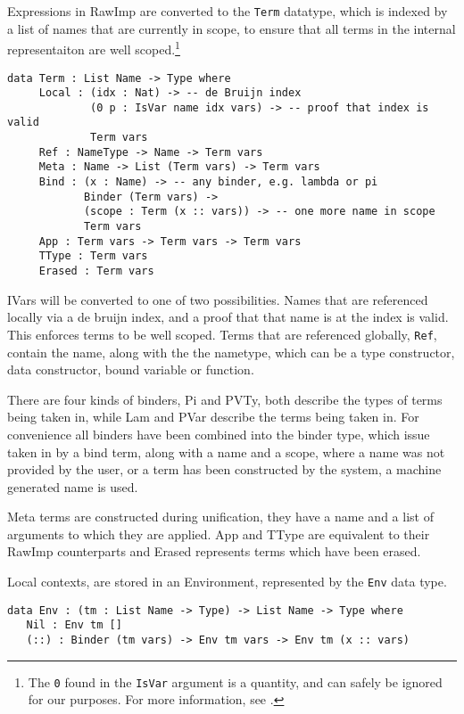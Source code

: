 \documentclass[a4paper]{article}
\begin{document}
Expressions in RawImp are converted to the \texttt{Term} datatype, which is 
indexed by a list of names that are currently in scope, to ensure that
all terms in the internal representaiton are well scoped.\footnote{The \texttt{0} found in the \texttt{IsVar} argument is a quantity, and can safely be ignored for our purposes. For more information, see .}

\begin{center}
\begin{verbatim}
data Term : List Name -> Type where
	 Local : (idx : Nat) -> -- de Bruijn index
			 (0 p : IsVar name idx vars) -> -- proof that index is valid
			 Term vars
	 Ref : NameType -> Name -> Term vars 
	 Meta : Name -> List (Term vars) -> Term vars
	 Bind : (x : Name) -> -- any binder, e.g. lambda or pi
			Binder (Term vars) ->
			(scope : Term (x :: vars)) -> -- one more name in scope
			Term vars
	 App : Term vars -> Term vars -> Term vars 
	 TType : Term vars
	 Erased : Term vars
\end{verbatim}
\end{center}

IVars will be converted to one of two possibilities. Names that are
referenced locally via a de bruijn index, and a proof that that name
is at the index is valid. This enforces terms to be well scoped. Terms 
that are referenced globally, \texttt{Ref}, contain the name, along with the the
nametype, which can be a type constructor, data constructor, bound 
variable or function. 

There are four kinds of binders, Pi and PVTy, both describe the types 
of terms being taken in, while Lam and PVar describe the terms being
taken in. For convenience all binders have been combined into the binder type, 
which issue taken in by a bind term, along with a name and a scope,
where a name was not provided by the user, or a term has been 
constructed by the system, a machine generated name is used. 

Meta terms are constructed during unification, they have a name and a
list of arguments to which they are applied. App and TType are 
equivalent to their RawImp counterparts and Erased represents
terms which have been erased.

Local contexts, are stored in an Environment, represented by the \texttt{Env}
data type.

\begin{center}
\begin{verbatim}
data Env : (tm : List Name -> Type) -> List Name -> Type where
   Nil : Env tm []
   (::) : Binder (tm vars) -> Env tm vars -> Env tm (x :: vars)
\end{verbatim}
\end{center}
\end{document}
